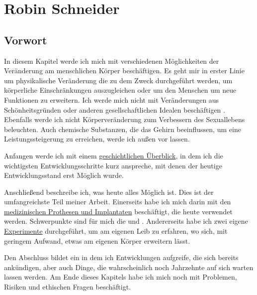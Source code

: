 \chapter{Robin Schneider}
\label{sec:Robin_Schneider}


\section{Vorwort}
In diesem Kapitel werde ich mich mit verschiedenen Möglichkeiten der Veränderung am menschlichen Körper beschäftigen.
Es geht mir in erster Linie um physikalische Veränderung die zu dem Zweck durchgeführt werden,
um körperliche Einschränkungen auszugleichen oder um den Menschen um neue Funktionen zu erweitern.
Ich werde mich nicht mit Veränderungen aus Schönheitsgründen
oder anderen gesellschaftlichen Idealen beschäftigen .
Ebenfalls werde ich nicht Körperveränderung zum Verbessern des Sexuallebens beleuchten.
Auch chemische Substanzen, die das Gehirn beeinflussen,
um eine Leistungssteigerung zu erreichen, werde ich außen vor lassen.


\bigskip
Anfangen werde ich mit einem \hyperref[sec:Robin:historical_overview]{geschichtlichen Überblick},
in dem ich die wichtigsten Entwicklungsschritte kurz anspreche, mit denen der heutige
Entwicklungsstand erst Möglich wurde.

Anschließend beschreibe ich, was heute alles Möglich ist.
Dies ist der umfangreichste Teil meiner Arbeit. Einerseits habe ich mich darin mit den
\hyperref[sec:Robin:topical]{medizinischen Prothesen und Implantaten} beschäftigt, die heute
verwendet werden. Schwerpunkte sind für mich die
 und .
Andererseits habe ich zwei eigene \hyperref[sec:Robin:experiments]{Experimente} durchgeführt, um am
eigenen Leib zu erfahren, wo sich, mit geringem Aufwand, etwas am eigenen Körper erweitern lässt.

Den Abschluss bildet ein  in dem ich Entwicklungen aufgreife, die sich
bereits ankündigen, aber auch Dinge, die wahrscheinlich noch Jahrzehnte auf sich warten lassen
werden. Am Ende dieses Kapitels habe ich mich noch mit Problemen, Risiken und ethischen
Fragen beschäftigt.









\nocite{
	Spektrum:Weg_zu_intelligenten_Prothesen,
	thesis:Cyborg,
	Stern:pacemaker,
	Heise:Telepolis:Mensch:Cyborg,
}



\printbibliography[heading=source,keyword=Robin]
